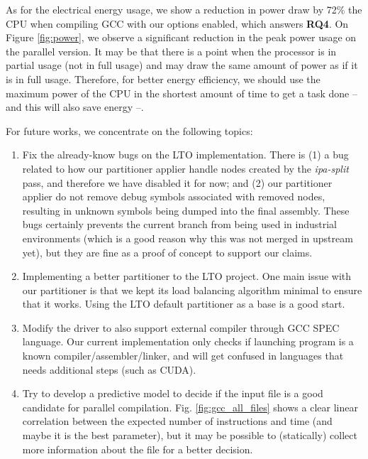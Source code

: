 As for the electrical energy usage, we show a reduction in power draw by 72\% the
CPU when compiling GCC with our options enabled, which answers \textbf{RQ4}. On
Figure \ref{fig:power}, we observe a significant reduction in the peak power
usage on the parallel version. It may be that there is a point when the
processor is in partial usage (not in full usage) and may draw the same amount
of power as if it is in full usage. Therefore, for better energy efficiency, we
should use the maximum power of the CPU in the shortest amount of time to get a
task done -- and this will also save energy --.

For future works, we concentrate on the following topics:

\begin{enumerate}

\item Fix the already-know bugs on the LTO implementation. There is (1) a bug related
to how our partitioner applier handle nodes created by the \textit{ipa-split}
pass, and therefore we have disabled it for now; and (2) our partitioner
applier do not remove debug symbols associated with removed nodes, resulting in
unknown symbols being dumped into the final assembly. These bugs certainly prevents the
current branch from being used in industrial environments (which is a good
reason why this was not merged in upstream yet), but they are fine as a proof
of concept to support our claims.

\item Implementing a better partitioner to the LTO project. One main issue
with our partitioner is that we kept its load balancing algorithm minimal to
ensure that it works. Using the LTO default partitioner as a base is a good start.

\item Modify the driver to also support external compiler through GCC
SPEC language. Our current implementation only checks if launching program
is a known compiler/assembler/linker, and will get confused in languages that
needs additional steps (such as CUDA).

\item Try to develop a predictive model to decide if the input file is
a good candidate for parallel compilation. Fig. \ref{fig:gcc_all_files} shows
a clear linear correlation between the expected number of instructions and time
(and maybe it is the best parameter), but it may be possible to (statically)
collect more information about the file for a better decision.


\end{enumerate}
